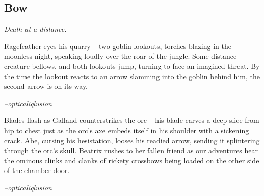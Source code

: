 \subsection{Bow}
\textit{Death at a distance.}

\begin{quotebox}
Ragefeather eyes his quarry -- two goblin lookouts, torches blazing in the moonless night, speaking loudly over the roar of the jungle. Some distance creature bellows, and both lookouts jump, turning to face an imagined threat. By the time the lookout reacts to an arrow slamming into the goblin behind him, the second arrow is on its way.

\textit{--opticaliqlusion}
\end{quotebox}

\begin{quotebox}
Blades flash as Galland counterstrikes the orc -- his blade carves a deep slice from hip to chest just as the orc's axe embeds itself in his shoulder with a sickening crack. Abe, cursing his hesistation, looses his readied arrow, sending it splintering through the orc's skull. Beatrix rushes to her fallen friend as our adventures hear the ominous clinks and clanks of rickety crossbows being loaded on the other side of the chamber door.

\textit{--opticaliqlusion}
\end{quotebox}
